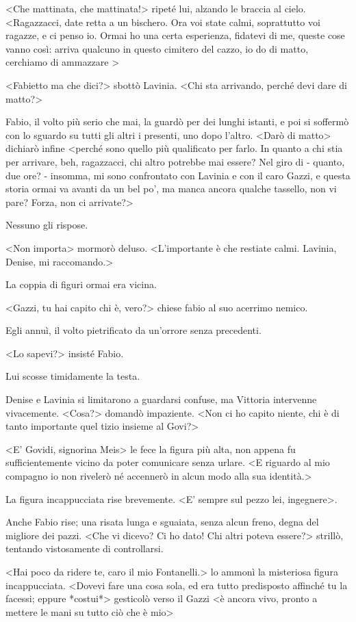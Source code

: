 <Che mattinata, che mattinata!> ripeté lui, alzando le braccia al cielo. <Ragazzacci, date retta a un bischero. Ora voi state calmi, soprattutto voi ragazze, e ci penso io. Ormai ho una certa esperienza, fidatevi di me, queste cose vanno così: arriva qualcuno in questo cimitero del cazzo, io do di matto, cerchiamo di ammazzare  >

<Fabietto ma che dici?> sbottò Lavinia. <Chi sta arrivando, perché devi dare di matto?>

Fabio, il volto più serio che mai, la guardò per dei lunghi istanti, e poi si soffermò con lo sguardo su tutti gli altri i presenti, uno dopo l'altro. <Darò di matto> dichiarò infine <perché sono quello più qualificato per farlo. In quanto a chi stia per arrivare, beh, ragazzacci, chi altro potrebbe mai essere? Nel giro di - quanto, due ore? - insomma, mi sono confrontato con Lavinia e con il caro Gazzi, e questa storia ormai va avanti da un bel po', ma manca ancora qualche tassello, non vi pare? Forza, non ci arrivate?>

Nessuno gli rispose.

<Non importa> mormorò deluso. <L'importante è che restiate calmi. Lavinia, Denise, mi raccomando.>

La coppia di figuri ormai era vicina.

<Gazzi, tu hai capito chi è, vero?> chiese fabio al suo acerrimo nemico. 

Egli annuì, il volto pietrificato da un'orrore senza precedenti.

<Lo sapevi?> insisté Fabio.

Lui scosse timidamente la testa.

Denise e Lavinia si limitarono a guardarsi confuse, ma Vittoria intervenne vivacemente. <Cosa?> domandò impaziente. <Non ci ho capito niente, chi è di tanto importante quel tizio insieme al Govi?>

<E' Govidi, signorina Meis> le fece la figura più alta, non appena fu sufficientemente vicino da poter comunicare senza urlare. <E riguardo al mio compagno io non rivelerò né accennerò in alcun modo alla sua identità.>

La figura incappucciata rise brevemente. <E' sempre sul pezzo lei, ingegnere>.

Anche Fabio rise; una risata lunga e sguaiata, senza alcun freno, degna del migliore dei pazzi. <Che vi dicevo? Ci ho dato! Chi altri poteva essere?> strillò, tentando vistosamente di controllarsi.

<Hai poco da ridere te, caro il mio Fontanelli.> lo ammonì la misteriosa figura incappucciata. <Dovevi fare una cosa sola, ed era tutto predisposto affinché tu la facessi; eppure *costui*> gesticolò verso il Gazzi <è ancora vivo, pronto a mettere le mani su tutto ciò che è mio>


